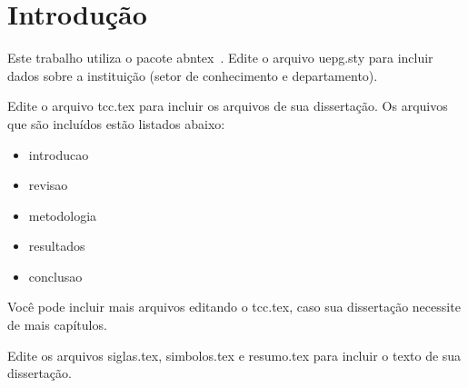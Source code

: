 \chapter{Introdução}
Este trabalho utiliza o pacote abntex~\cite{abntex2classe}. 
Edite o arquivo uepg.sty para incluir dados sobre a instituição (setor de conhecimento e departamento).

Edite o arquivo tcc.tex para incluir os arquivos de sua dissertação. Os arquivos que são incluídos estão listados abaixo:

\begin{itemize}	
	\item introducao
	\item revisao
 	\item metodologia
	\item resultados
	\item conclusao
\end{itemize}

Você pode incluir mais arquivos editando o tcc.tex, caso sua dissertação necessite de mais capítulos.

Edite os arquivos siglas.tex, simbolos.tex e resumo.tex para incluir o texto de sua dissertação.

